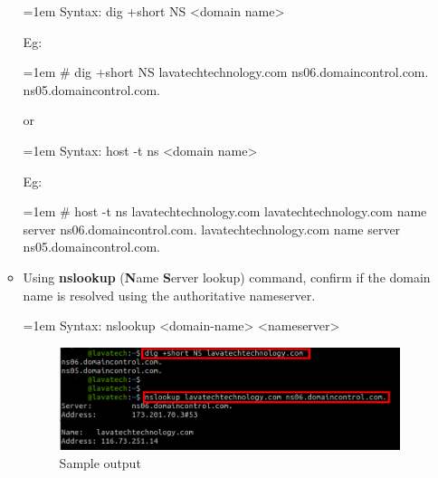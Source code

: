 \begin{flushleft}
\begin{itemize}
\begin{itemize}
\begin{tcolorbox}[breakable,notitle,boxrule=0pt,colback=pink,colframe=pink]
				\color{black}
				\font=1em
				Syntax: dig +short NS <domain name>
				\font=4pt
			\end{tcolorbox}
			Eg:
			\begin{tcolorbox}[breakable,notitle,boxrule=-0pt,colback=black,colframe=black]
				\color{green}
				\font=1em
				\# dig +short NS lavatechtechnology.com
				\newline
				\color{white}
				ns06.domaincontrol.com.
				\newline
				ns05.domaincontrol.com.
				\font=4pt
			\end{tcolorbox}
			
			or 
			\begin{tcolorbox}[breakable,notitle,boxrule=0pt,colback=pink,colframe=pink]
				\color{black}
				\font=1em
				Syntax: host -t ns <domain name>
				\font=4pt
			\end{tcolorbox}
			Eg:
			\begin{tcolorbox}[breakable,notitle,boxrule=-0pt,colback=black,colframe=black]
				\color{green}
				\font=1em
				\# host -t ns lavatechtechnology.com
				\newline
				\color{white}
				lavatechtechnology.com name server ns06.domaincontrol.com.
				\newline
				lavatechtechnology.com name server ns05.domaincontrol.com.
				\font=4pt
			\end{tcolorbox}
			
			\bigskip
			\item Using \textbf{nslookup} (\textbf{N}ame \textbf{S}erver lookup) command, confirm if the domain name is resolved using the authoritative nameserver.
			\begin{tcolorbox}[breakable,notitle,boxrule=0pt,colback=pink,colframe=pink]
				\color{black}
				\font=1em
				Syntax: nslookup <domain-name> <nameserver>
				\font=4pt
			\end{tcolorbox}
			
			\begin{figure}[h!]
				\centering
				\includegraphics[scale=.35]{content/chapter3/images/ans.png}
				\caption{Sample output}
				\label{fig:dns_heir3}
			\end{figure}			
		

\end{itemize}
\end{itemize}
\end{flushleft}
